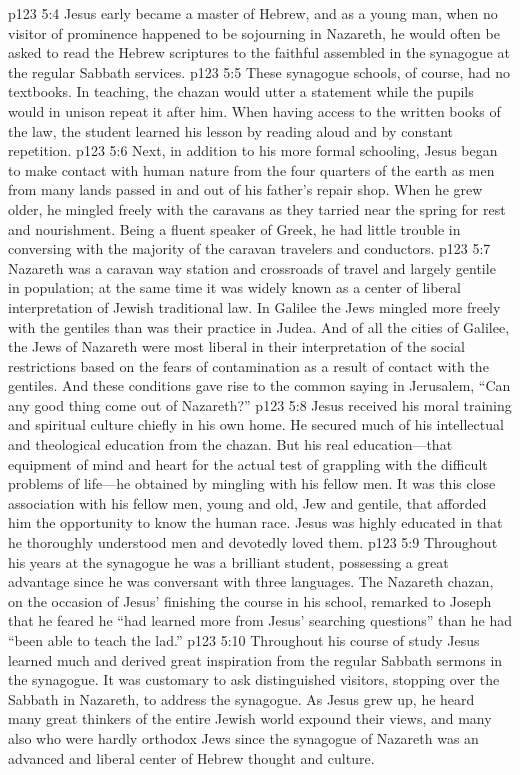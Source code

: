 \vs p123 5:4 Jesus early became a master of Hebrew, and as a young man, when no visitor of prominence happened to be sojourning in Nazareth, he would often be asked to read the Hebrew scriptures to the faithful assembled in the synagogue at the regular Sabbath services.
\vs p123 5:5 These synagogue schools, of course, had no textbooks. In teaching, the chazan would utter a statement while the pupils would in unison repeat it after him. When having access to the written books of the law, the student learned his lesson by reading aloud and by constant repetition.
\pc \vs p123 5:6 Next, in addition to his more formal schooling, Jesus began to make contact with human nature from the four quarters of the earth as men from many lands passed in and out of his father’s repair shop. When he grew older, he mingled freely with the caravans as they tarried near the spring for rest and nourishment. Being a fluent speaker of Greek, he had little trouble in conversing with the majority of the caravan travelers and conductors.
\vs p123 5:7 Nazareth was a caravan way station and crossroads of travel and largely gentile in population; at the same time it was widely known as a center of liberal interpretation of Jewish traditional law. In Galilee the Jews mingled more freely with the gentiles than was their practice in Judea. And of all the cities of Galilee, the Jews of Nazareth were most liberal in their interpretation of the social restrictions based on the fears of contamination as a result of contact with the gentiles. And these conditions gave rise to the common saying in Jerusalem, “Can any good thing come out of Nazareth?”
\vs p123 5:8 Jesus received his moral training and spiritual culture chiefly in his own home. He secured much of his intellectual and theological education from the chazan. But his real education---that equipment of mind and heart for the actual test of grappling with the difficult problems of life---he obtained by mingling with his fellow men. It was this close association with his fellow men, young and old, Jew and gentile, that afforded him the opportunity to know the human race. Jesus was highly educated in that he thoroughly understood men and devotedly loved them.
\pc \vs p123 5:9 Throughout his years at the synagogue he was a brilliant student, possessing a great advantage since he was conversant with three languages. The Nazareth chazan, on the occasion of Jesus’ finishing the course in his school, remarked to Joseph that he feared he “had learned more from Jesus’ searching questions” than he had “been able to teach the lad.”
\vs p123 5:10 Throughout his course of study Jesus learned much and derived great inspiration from the regular Sabbath sermons in the synagogue. It was customary to ask distinguished visitors, stopping over the Sabbath in Nazareth, to address the synagogue. As Jesus grew up, he heard many great thinkers of the entire Jewish world expound their views, and many also who were hardly orthodox Jews since the synagogue of Nazareth was an advanced and liberal center of Hebrew thought and culture.\plusone
